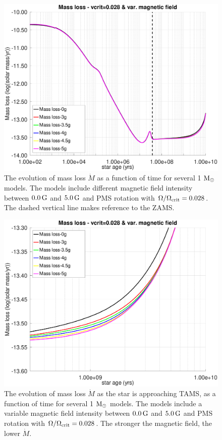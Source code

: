 \documentclass[fleqn,usenatbib]{mnras}
\begin{document}
\begin{figure}
	\includegraphics[trim = 5mm 10mm 20mm 10mm, clip,width=\columnwidth]{figures/mdot_vc_028_var_g.eps}
    \caption{The evolution of mass loss $\Dot{M}$ as a function of time for several 1 $\mathrm{M}_\odot$ models. The models include different magnetic field intensity between $0.0\,\mathrm{G}$ and $5.0\,\mathrm{G}$ and PMS rotation with $\Omega / \Omega_{\mathrm{crit}}=0.028$. The dashed vertical line makes reference to the ZAMS.}
    \label{fig:mdot_vc_028_var_b}
\end{figure}

\begin{figure}
	\includegraphics[trim = 5mm 10mm 20mm 10mm, clip,width=\columnwidth]{figures/mdot_vc_028_var_g_z1.eps}
    \caption{The evolution of mass loss $\Dot{M}$ as the star is approaching TAMS, as a function of time for several 1 $\mathrm{M}_\odot$ models. The models include a variable magnetic field intensity between $0.0\,\mathrm{G}$ and $5.0\,\mathrm{G}$ and PMS rotation with $\Omega / \Omega_{\mathrm{crit}}=0.028$. The stronger the magnetic field, the lower $\Dot{M}$.}
    \label{fig:mdot_vc_028_var_b_z1}
\end{figure}
\end{document}
